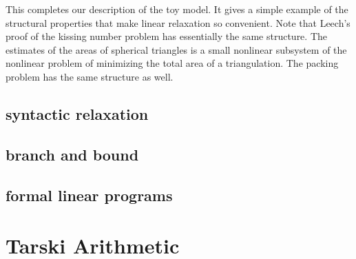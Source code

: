 This completes our description of the toy model.  It gives a simple example of the
structural properties that make linear relaxation so convenient.
Note that Leech's proof of the kissing number problem has essentially the same
structure.  The estimates of the areas of spherical triangles is a small nonlinear subsystem
of the nonlinear problem of minimizing the total area of a triangulation.
The packing problem has the same structure as well.



\subsection{syntactic relaxation}





\subsection{branch and bound}

\subsection{formal linear programs}




\clearpage




\section{Tarski Arithmetic}


\clearpage
